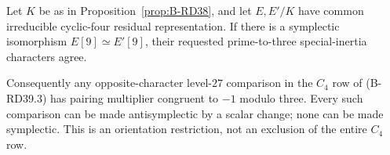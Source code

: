 \begin{proposition}
\label{prop:B-RD40}
Let $K$ be as in Proposition~\ref{prop:B-RD38}, and let $E,E'/K$
have common irreducible cyclic-four residual representation. If there
is a symplectic isomorphism $E[9]\simeq E'[9]$, their requested
prime-to-three special-inertia characters agree.

Consequently any opposite-character level-$27$ comparison in the
$C_4$ row of (B-RD39.3) has pairing multiplier congruent to $-1$
modulo three. Every such comparison can be made antisymplectic by a
scalar change; none can be made symplectic. This is an orientation
restriction, not an exclusion of the entire $C_4$ row.
\end{proposition}

